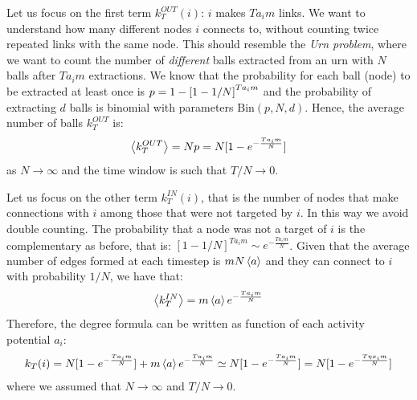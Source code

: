\documentclass[../main/main.tex]{subfiles}
\begin{document}
Let us focus on the first term \( k_T^{OUT} (i) \): $i$ makes $T a_i m$ links.
We want to understand how many different nodes $i$ connects to, without counting twice repeated links with the same node. This should resemble the \textit{Urn problem}, where we want to count the number of \textit{different} balls extracted from an urn with $N$ balls after $T a_i m$ extractions.
We know that the probability for each ball (node) to be extracted at least once is $p = 1 - \qty[ 1 - 1/N ]^{T a_i m}$ and the probability of extracting $d$ balls is binomial with parameters $\text{Bin}(p, N, d)$. Hence, the average number of balls $k_T^{OUT}$ is:
\begin{equation}
    \expval{ k_T^{OUT} } = Np = N [1-e^{-\frac{T a_i m}{N}} ]
\end{equation}
as $N \to \infty$ and the time window is such that $T/N \to 0$.


Let us focus on the other term $k_T^{IN}(i)$, that is the number of nodes that make connections with $i$ among those that were not targeted by $i$. In this way we avoid double counting. The probability that a node was not a target of $i$ is the complementary as before, that is: $[1-1/N]^{T a_i m} \sim e^{-\frac{T a_i m}{N}}$. Given that the average number of edges formed at each timestep is $m N \expval{a}$ and they can connect to $i$ with probability $1/N$, we have that:
\begin{equation}
    \expval{k_T^{IN}} = m \expval{a} e^{-\frac{T a_i m}{N}}
\end{equation}
Therefore, the degree formula can be written as function of each activity potential $a_i$:
\begin{align}
    k_T(i) = N[1-e^{-\frac{T a_i m}{N}}]
    + m \expval{a} e^{-\frac{T a_i m}{N}}
    \simeq N[1-e^{-\frac{T a_i m}{N}}]
     = N[1-e^{-\frac{T \eta x_i m}{N}}]
\end{align}
where we assumed that $N \to \infty$ and $T/N \to 0$.
\end{document}

